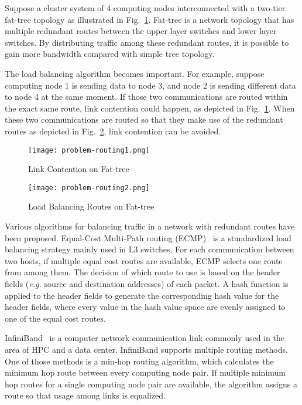 Suppose a cluster system of 4 computing nodes interconnected with a
two-tier fat-tree topology as illustrated in Fig.~\ref{fig:problem-routing1}.
Fat-tree is a network topology that has multiple redundant routes between the
upper layer switches and lower layer switches. By distributing traffic among
these redundant routes, it is possible to gain more bandwidth compared with
simple tree topology.

The load balancing algorithm becomes important. For example, suppose
computing node 1 is sending data to node 3, and node 2 is sending
different data to node 4 at the same moment. If those two communications
are routed within the exact same route, link contention could happen, as
depicted in Fig.~\ref{fig:problem-routing1}. When these two
communications are routed so that they make use of the redundant routes
as depicted in Fig.~\ref{fig:problem-routing2}, link contention can be
avoided.

\begin{figure}
    \centering
    \texttt{[image: problem-routing1.png]}
    \caption{Link Contention on Fat-tree}%
    \label{fig:problem-routing1}
\end{figure}

\begin{figure}
    \centering
    \texttt{[image: problem-routing2.png]}
    \caption{Load Balancing Routes on Fat-tree}%
    \label{fig:problem-routing2}
\end{figure}

Various algorithms for balancing traffic in a network with redundant
routes have been proposed. Equal-Cost Multi-Path routing (ECMP)~\autocite{ecmp} is
a standardized load balancing strategy mainly used in L3 switches. For each
communication between two hosts, if multiple equal cost routes are available,
ECMP selects one route from among them. The decision of which route to use is
based on the header fields (\emph{e.g.} source and destination addresses) of
each packet. A hash function is applied to the header fields to generate the
corresponding hash value for the header fields, where every value in the hash
value space are evenly assigned to one of the equal cost routes.

InfiniBand~\autocite{infiniband} is a computer network communication link
commonly used in the area of HPC and a data center. InfiniBand supports
multiple routing methods. One of those methods is a min-hop routing
algorithm, which calculates the minimum hop route between every
computing node pair. If multiple minimum hop routes for a single
computing node pair are available, the algorithm assigns a route so that
usage among links is equalized.

